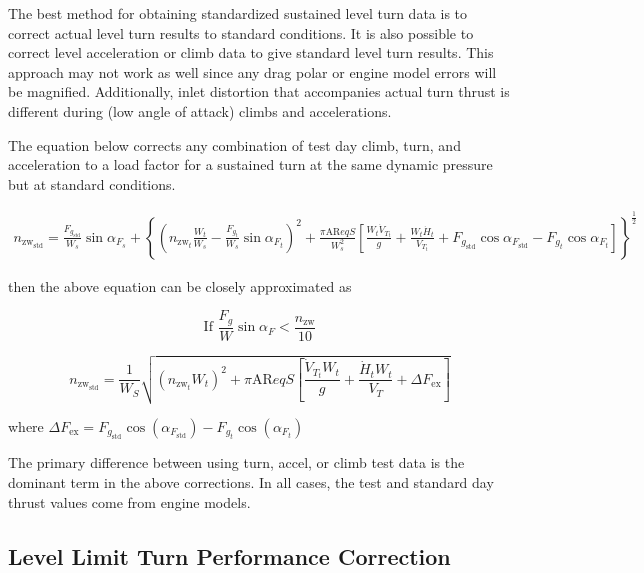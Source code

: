 \documentclass[
]{book}
\begin{document}
The best method for obtaining standardized sustained level turn data is to
correct actual level turn results to standard conditions. It is also possible
to correct level acceleration or climb data to give standard level turn results.
This approach may not work as well since any drag polar or engine model errors
will be magnified. Additionally, inlet distortion that accompanies actual turn
thrust is different during (low angle of attack) climbs and accelerations.

The equation below corrects any combination of test day climb, turn, and
acceleration to a load factor for a sustained turn at the same dynamic pressure
but at standard conditions.

\begin{align}
n_{\text{zw}_{\text{std}}} = \frac{F_{g_{\text{std}}}}{W_s} \sin \alpha_{F_s} + 
\left\{ 
      \left(
            n_{\text{zw}_t} \frac{W_t}{W_s} -
            \frac{F_{g_t}}{W_s} \sin \alpha_{F_t}
      \right)^2 + 
      \frac{\pi \mathrm{AR}eqS}{W_s^2}
      \left[
            \frac{W_t \dot{V}_{T_t}}{g} + 
            \frac{W_t \dot{H}_t}{V_{T_t}} + 
            F_{g_{\text{std}}} \cos \alpha_{F_{\text{std}}} -
            F_{g_t} \cos \alpha_{F_t}
      \right]
\right\}^{\frac{1}{2}}
\label{eq:load-factor-corr}
\end{align}

then the above equation can be closely approximated as

\[
\text{If } \frac{F_g}{W} \sin \alpha_F  <  \frac{n_{\text{zw}}}{10}
\]

\[
n_{\text{zw}_{\text{std}}} = \frac{1}{W_S}
\sqrt{ 
      \left(
            n_{\text{zw}_t} W_t 
      \right)^2 + \pi \mathrm{AR}eqS 
      \left[
            \frac{\dot{V}_{T_t} W_t}{g} +
            \frac{\dot{H}_t W_t}{V_T} +
            \Delta F_{\text{ex}}
      \right]
 }
\label{eq:load-factor-std}
\]

where \(\Delta F_{\text{ex}} = F_{g_{\text{std}}} \cos \left( \alpha_{F_{\text{std}}} \right) - F_{g_t} \cos \left( \alpha_{F_t} \right)\)

The primary difference between using turn, accel, or climb test data is the
dominant term in the above corrections. In all cases, the test and standard day
thrust values come from engine models.

\hypertarget{level-limit-turn-performance-correction}{%
\subsection{Level Limit Turn Performance Correction}\label{level-limit-turn-performance-correction}}
\end{document}
